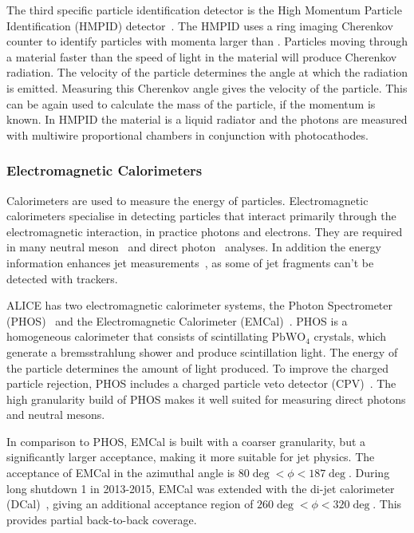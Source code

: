 The third specific particle identification detector is the High Momentum Particle Identification (HMPID) detector~\cite{Beole:1998yq}. The HMPID uses a ring imaging Cherenkov counter to identify particles with momenta larger than \unit[1]{\gev}. Particles moving through a material faster than the speed of light in the material will produce Cherenkov radiation. The velocity of the particle determines the angle at which the radiation is emitted. Measuring this Cherenkov angle gives the velocity of the particle. This can be again used to calculate the mass of the particle, if the momentum is known. In HMPID the material is a liquid radiator and the photons are measured with multiwire proportional chambers in conjunction with photocathodes. 




\subsubsection{Electromagnetic Calorimeters}
\label{sec:emcal}
Calorimeters are used to measure the energy of particles. Electromagnetic calorimeters specialise in detecting particles that interact primarily through the electromagnetic interaction, in practice photons and electrons. They are required in many neutral meson~\cite{Abelev:2012cn} and direct photon~\cite{Adam:2015lda} analyses. In addition the energy information enhances jet measurements~\cite{Reed:2013rpa}, as some of jet fragments can't be detected with trackers.
\setlength{\emergencystretch}{3em}


ALICE has two electromagnetic calorimeter systems, the Photon Spectrometer (PHOS)~\cite{PHOS} and the Electromagnetic Calorimeter (EMCal)~\cite{Cortese:2008zza}. PHOS is a homogeneous calorimeter that consists of scintillating $\mathrm{PbWO_4}$ crystals, which generate a bremsstrahlung  shower and produce scintillation light. The energy of the particle determines the amount of light produced. To improve the charged particle rejection, PHOS includes a charged particle veto detector (CPV)~\cite{PHOS}. The high granularity build of PHOS makes it well suited for measuring direct photons and neutral mesons.

In comparison to PHOS, EMCal is built with a coarser granularity, but a significantly larger acceptance, making it more suitable for jet physics. The acceptance of EMCal in the azimuthal angle is $ 80\deg < \phi < 187 \deg$. During long shutdown 1 in 2013-2015, EMCal was extended with the di-jet calorimeter (DCal)~\cite{DCAL}, giving an additional acceptance region of $ 260\deg < \phi < 320 \deg$. This provides partial back-to-back coverage. 


